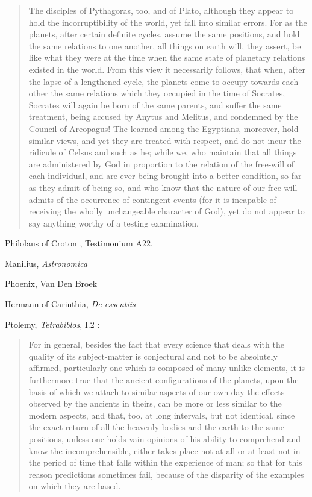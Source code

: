 \documentclass{article}
\begin{document}
\begin{quote}
The disciples of Pythagoras, too, and of Plato, although they appear to hold the incorruptibility of the world, yet fall into similar errors. For as the planets, after certain definite cycles, assume the same positions, and hold the same relations to one another, all things on earth will, they assert, be like what they were at the time when the same state of planetary relations existed in the world. From this view it necessarily follows, that when, after the lapse of a lengthened cycle, the planets come to occupy towards each other the same relations which they occupied in the time of Socrates, Socrates will again be born of the same parents, and suffer the same treatment, being accused by Anytus and Melitus, and condemned by the Council of Areopagus! The learned among the Egyptians, moreover, hold similar views, and yet they are treated with respect, and do not incur the ridicule of Celsus and such as he; while we, who maintain that all things are administered by God in proportion to the relation of the free-will of each individual, and are ever being brought into a better condition, so far as they admit of being so, and who know that the nature of our free-will admits of the occurrence of contingent events (for it is incapable of receiving the wholly unchangeable character of God), yet do not appear to say anything worthy of a testing examination.
\end{quote}

Philolaus of Croton \cite[p.~276]{philolaus}, Testimonium A22.

Manilius, {\em Astronomica} 

Phoenix, Van Den Broek \cite{phoenix}

Hermann of Carinthia, {\em De essentiis} \cite{essentiis}

Ptolemy, {\em Tetrabiblos}, I.2 \cite[pp.~15--17]{tetrabiblos}:

\begin{quote}
For in general, besides the fact that every science that deals with the quality of its subject-matter is conjectural and not to be absolutely affirmed, particularly one which is composed of many unlike elements, it is furthermore true that the ancient configurations of the planets, upon the basis of which we attach to similar aspects of our own day the effects observed by the ancients in theirs, can be more or less similar to the modern aspects, and that, too, at long intervals, but not identical, since the exact return of all the heavenly bodies and the earth to the same positions, unless one holds vain opinions of his ability to comprehend and know the incomprehensible, either takes place not at all or at least not in the period of time that falls within the experience of man; so that for this reason predictions sometimes fail, because of the disparity of the examples on which they are based.
\end{quote}
\end{document}
